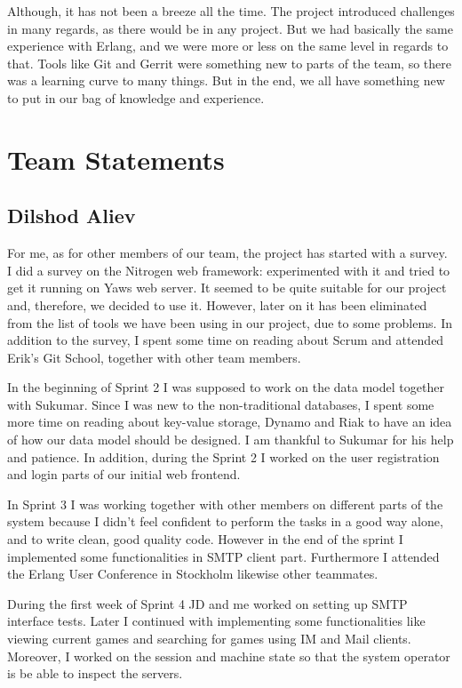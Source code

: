 \documentclass[11pt,a4paper]{report}
\begin{document}
Although, it has not been a breeze all the time. The project introduced
challenges in many regards, as there would be in any project. But we had
basically the same experience with Erlang, and we were more or less on the same
level in regards to that. Tools like Git and Gerrit were something new to parts
of the team, so there was a learning curve to many things. But in the end, we
all have something new to put in our bag of knowledge and experience.

\appendix

\chapter{Team Statements}

\section{Dilshod Aliev}
For me, as for other members of our team, the project has started with a survey.
I did a survey on the Nitrogen web framework: experimented with it and tried to
get it running on Yaws web server. It seemed to be quite suitable for our
project and, therefore, we decided to use it. However, later on it has been
eliminated from the list of tools we have been using in our project, due to some
problems. In addition to the survey, I spent some time on reading about Scrum
and attended Erik's Git School, together with other team members.

In the beginning of Sprint 2 I was supposed to work on the data model together
with Sukumar. Since I was new to the non-traditional databases, I spent some
more time on reading about key-value storage, Dynamo and Riak to have an idea of
how our data model should be designed. I am thankful to Sukumar for his help
and patience. In addition, during the Sprint 2 I worked on the user registration
and login parts of our initial web frontend.

In Sprint 3 I was working together with other members on different parts of the
system because I didn't feel confident to perform the tasks in a good way alone,
and to write clean, good quality code. However in the end of the sprint I
implemented some functionalities in SMTP client part. Furthermore I attended the
Erlang User Conference in Stockholm likewise other teammates.

During the first week of Sprint 4 JD and me worked on setting up SMTP
interface tests. Later I continued with implementing some functionalities like
viewing current games and searching for games using IM and Mail clients.
Moreover, I worked on the session and machine state so that the system operator
is be able to inspect the servers.
\end{document}
